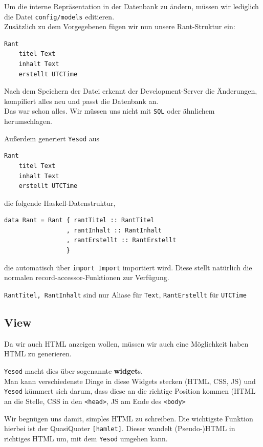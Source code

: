 \documentclass{beamer}
\begin{document}
\begin{frame}[fragile]
Um die interne Repräsentation in der Datenbank zu ändern, müssen wir lediglich die Datei \texttt{config/models} editieren. \\\pause
Zusätzlich zu dem Vorgegebenen fügen wir nun unsere Rant-Struktur ein:
\begin{verbatim}
Rant
    titel Text
    inhalt Text
    erstellt UTCTime
\end{verbatim}
\pause
Nach dem Speichern der Datei erkennt der Development-Server die Änderungen, kompiliert alles neu und passt die Datenbank an.\\\pause
Das war schon alles. Wir müssen uns nicht mit \texttt{SQL} oder ähnlichem herumschlagen.
\end{frame}

\begin{frame}[fragile]
Außerdem generiert \texttt{Yesod} aus
\begin{verbatim}
Rant
    titel Text
    inhalt Text
    erstellt UTCTime
\end{verbatim}
\pause
die folgende Haskell-Datenstruktur,
\begin{verbatim}
data Rant = Rant { rantTitel :: RantTitel
                 , rantInhalt :: RantInhalt
                 , rantErstellt :: RantErstellt
                 }
\end{verbatim}
\pause
die automatisch über \texttt{import Import} importiert wird. Diese stellt natürlich die normalen record-accessor-Funktionen zur Verfügung.\\\par\pause
\texttt{RantTitel, RantInhalt} sind nur Aliase für \texttt{Text}, \texttt{RantErstellt} für \texttt{UTCTime}
\end{frame}

\subsection{View}

\begin{frame}[fragile]
Da wir auch HTML anzeigen wollen, müssen wir auch eine Möglichkeit haben HTML zu generieren.\\\pause\par
\texttt{Yesod} macht dies über sogenannte \textbf{widget}s. \\\pause
Man kann verschiedenste Dinge in diese Widgets stecken (HTML, CSS, JS) und \texttt{Yesod} kümmert sich darum, dass diese an die richtige Position kommen (HTML an die Stelle, CSS in den \texttt{<head>}, JS am Ende des \texttt{<body>}\\\par
\pause
Wir begnügen uns damit, simples HTML zu schreiben. Die wichtigste Funktion hierbei ist der QuasiQuoter \texttt{[hamlet]}. Dieser wandelt (Pseudo-)HTML in richtiges HTML um, mit dem \texttt{Yesod} umgehen kann.
\end{frame}
\end{document}

